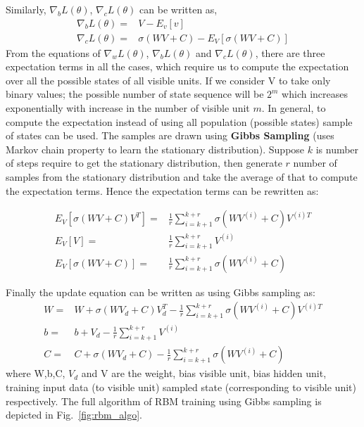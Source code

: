 \begin{spacing}{1.5}
Similarly, $\nabla_{b}L(\theta)$, $\nabla_{c}L(\theta)$ can be written as,
\begin{equation}
    \begin{aligned}
    \nabla_{b}L(\theta)=&V-E_{v}[v]\\
    \nabla_{c}L(\theta)=&\sigma(WV+C)-E_{V}[\sigma(WV+C)]
    \end{aligned}
\end{equation}
From the equations of $\nabla_{w}L(\theta)$, $\nabla_{b}L(\theta)$ and $\nabla_{c}L(\theta)$, there are three expectation terms in all the cases, which require us to compute the expectation over all the possible states of all visible units. If we consider V to take only binary values; the possible number of state sequence will be $2^{m}$ which increases exponentially with increase in the number of visible unit $m$. In general, to compute the expectation instead of using all population (possible states) sample of states can be used. The samples are drawn using \textbf{Gibbs Sampling} (uses Markov chain property to learn the stationary distribution). Suppose $k$ is number of steps require to get the stationary distribution, then generate $r$ number of samples from the stationary distribution and take the average of that to compute the expectation terms. Hence the expectation terms can be rewritten as:

\begin{equation}
    \begin{aligned}
    E_{V}[\sigma(WV+C)V^{T}]=&\frac{1}{r}\sum_{i=k+1}^{k+r}\sigma(WV^{(i)}+C)V^{(i)T}\\
    E_{V}[V]=&\frac{1}{r}\sum_{i=k+1}^{k+r}V^{(i)}\\
    E_{V}[\sigma(WV+C)]=&\frac{1}{r}\sum_{i=k+1}^{k+r}\sigma(WV^{(i)}+C)
    \end{aligned}
\end{equation}

Finally the update equation can be written as using Gibbs sampling as:
\begin{equation}
    \begin{aligned}
    W=&W+\sigma(WV_{d}+C)V_{d}^{T}-\frac{1}{r}\sum_{i=k+1}^{k+r}\sigma(WV^{(i)}+C)V^{(i)T}\\
    b=&b+V_{d}-\frac{1}{r}\sum_{i=k+1}^{k+r}V^{(i)}\\
    C=&C+\sigma(WV_{d}+C)-\frac{1}{r}\sum_{i=k+1}^{k+r}\sigma(WV^{(i)}+C)
    \end{aligned}
\end{equation}
where W,b,C, $V_{d}$ and V are the weight, bias visible unit, bias hidden unit, training input data (to visible unit) sampled state (corresponding to visible unit) respectively. The full algorithm of RBM training using Gibbs sampling is depicted in Fig.~\ref{fig:rbm_algo}.




\end{spacing}
